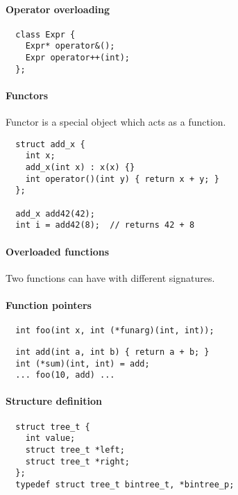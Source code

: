 \documentclass{memo}
\begin{document}
\paragraph{Operator overloading}
\begin{verbatim}
  class Expr {
    Expr* operator&();
    Expr operator++(int);
  };
\end{verbatim}

\paragraph{Functors}
Functor is a special object which acts as a function.
  \begin{verbatim}
  struct add_x {
    int x;
    add_x(int x) : x(x) {}
    int operator()(int y) { return x + y; }
  };

  add_x add42(42);
  int i = add42(8);  // returns 42 + 8
  \end{verbatim}


\paragraph{Overloaded functions}
\bit
\w Two functions can have  with different signatures. 
\eit

\paragraph{Function pointers}
\bit
\w {}
  \begin{verbatim}
  int foo(int x, int (*funarg)(int, int));
  \end{verbatim}

\w {}
  \begin{verbatim}
  int add(int a, int b) { return a + b; }
  int (*sum)(int, int) = add;
  ... foo(10, add) ...
  \end{verbatim}
\eit

\paragraph{Structure definition}
  \begin{verbatim}
  struct tree_t { 
    int value;
    struct tree_t *left;
    struct tree_t *right;
  };
  typedef struct tree_t bintree_t, *bintree_p;
  \end{verbatim}
\end{document}
